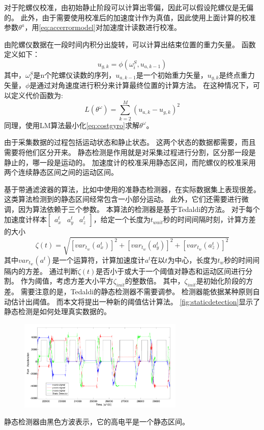 \documentclass[
  type=master
]{gdutthesis}
\begin{document}
对于陀螺仪校准，由初始静止阶段可以计算出零偏，因此可以假设陀螺仪是无偏的。
此外，由于需要使用校准后的加速度计作为真值，因此使用上面计算的校准参数$\theta^a$，用\autoref{eq:accerrormodel}对加速度计读数进行校准。

由陀螺仪数据在一段时间内积分出旋转，可以计算出结束位置的重力矢量。
函数定义如下：
\begin{equation}\label{eq:integration}
	u_{g,k}=\phi(\omega^S_i , u_{a,k-1})
\end{equation}
其中，$\omega^S_i$是n个陀螺仪读数的序列，$u_{a,k-1}$是一个初始重力矢量，$u_{g,k}$是终点重力矢量，$\phi$是通过对角速度进行积分来计算最终位置的计算方法。
在这种情况下，可以定义代价函数为:
\begin{equation}\label{eq:costgyro}
	L(\theta^\omega)=\sum_{k=2}^{M}(u_{a,k}-u_{g,k})^2
\end{equation}
同理，使用LM算法最小化\autoref{eq:costgyro}求解$\theta^\omega$。

由于采集数据的过程包括运动状态和静止状态。
这两个状态的数据都需要，而且需要将他们区分开来。
静态检测是作用就是对采集过程进行分割，区分那一段是静止的，哪一段是运动的。
加速度计的校准采用静态区间，而陀螺仪的校准采用两个连续静态区间之间的运动区间。

基于带通滤波器的算法，比如\parencite{fong2008methods}中使用的准静态检测器，在实际数据集上表现很差。
这类算法检测到的静态区间经常包含一小部分运动。
此外，它们还需要进行微调，因为算法依赖于三个参数。
本算法的检测器是基于Tedaldi的方法\cite{tedaldi2014robust}。
对于每个加速度计样本$\begin{bmatrix}
	a^t_x & a^t_y & a^t_z
\end{bmatrix}$，给定一个长度为$t_{wait}$秒的时间间隔时刻，计算方差的大小
\begin{equation}\label{eq:var}
	\zeta(t)=\sqrt{[var_{t_w}(a^t_x)]^2+[var_{t_w}(a^t_y)]^2+[var_{t_w}(a^t_z)]^2}
\end{equation}
其中$var_{t_w}(a^t)$是一个运算符，计算加速度计$a^t$在以$t$为中心，长度为$t_w$秒的时间间隔内的方差。
通过判断$\zeta(t)$是否小于或大于一个阈值对静态和运动区间进行分割。
作为阈值，考虑方差大小平方$\zeta_{init}$的整数倍。
其中，$\zeta_{init}$是初始化阶段的方差。
需要注意的是，Tedaldi的静态检测器不需要调参。
检测器能依据某种原则自动估计出阈值。
而本文将提出一种新的阈值估计算法。
\autoref{fig:staticdetection}显示了静态检测是如何处理真实数据的。
\begin{figure}[htbp]
	\centering
	\includegraphics[width=0.7\textwidth]{屏幕截图 2022-04-03 103640.png}
	\label{fig:staticdetection}
\end{figure}
静态检测器由黑色方波表示，它的高电平是一个静态区间。
\end{document}
